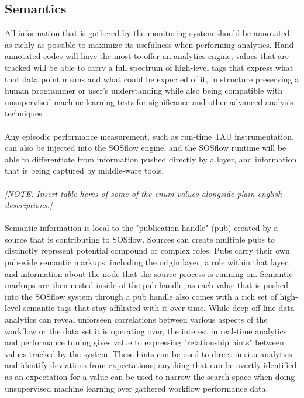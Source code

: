 \documentclass[12pt, conference, compsocconf]{IEEEtran}
\begin{document}
\subsection{Semantics}
All information that is gathered by the monitoring system should be annotated 
as richly as possible to maximize its usefulness when performing analytics. 
Hand-annotated codes will have the most to offer an analytics engine,  
values that are tracked will be able to carry a full spectrum of high-level 
tags that express what that data point means and what could be expected of it, 
in structure preserving a human programmer or user's understanding while also
being compatible with unsupervised machine-learning tests for significance and 
other advanced analysis techniques.\\
\\
Any episodic performance measurement, such as run-time TAU instrumentation, can 
also be injected into the SOSflow engine, and the SOSflow runtime will be able to 
differentiate from information pushed directly by a layer, and information that 
is being captured by middle-ware tools.\\
\\
\textit{[NOTE: Insert table heres of some of the enum values alongside 
plain-english descriptions.]}\\
\\
Semantic information is local to the "publication handle" (pub) 
created by a source that is contributing to SOSflow.  Sources can create 
multiple pubs to distinctly represent potential compound or complex roles. Pubs 
carry their own pub-wide semantic markups, including 
the origin layer, a role within that layer, and information 
about the node that the source process is running on. Semantic markups are then 
nested inside of the pub handle, as each value that is pushed 
into the SOSflow system through a pub handle also comes with a rich set of 
high-level semantic tags that stay affiliated with it over time. While deep 
off-line data analytics 
can reveal unforseen correlations between various aspects of the workflow or the 
data set it is operating over, the interest in real-time analytics and 
performance tuning gives value to expressing "relationship hints" between 
values tracked by the system. These hints can be used to direct in situ 
analytics and identify deviations from expectations; anything that can be 
overtly identified as an expectation for a value can be used to narrow the 
search space when doing unsupervised machine learning over gathered workflow 
performance data.
\end{document}
